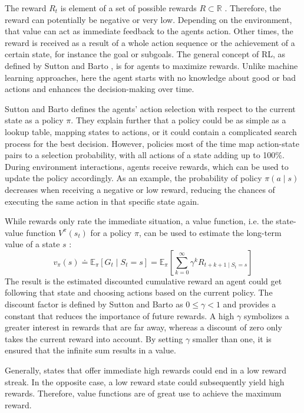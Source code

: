 The reward $R_t$ is element of a set of possible rewards $R \subset \mathbb{R}$ \cite{suba18}. Therefore, the reward can potentially be negative or very low. Depending on the environment, that value can act as immediate feedback to the agents action. Other times, the reward is received as a result of a whole action sequence or the achievement of a certain state, for instance the goal or subgoals. The general concept of RL, as defined by Sutton and Barto \cite{suba18}, is for agents to maximize rewards. Unlike machine learning approaches, here the agent starts with no knowledge about good or bad actions and enhances the decision-making over time.

Sutton and Barto defines the agents' action selection with respect to the current state as a policy $\pi$. They explain further that a policy could be as simple as a lookup table, mapping states to actions, or it could contain a complicated search process for the best decision. However, policies most of the time map action-state pairs to a selection probability, with all actions of a state adding up to 100\%.
During environment interactions, agents receive rewards, which can be used to update the policy accordingly. As an example, the probability of policy $\pi(a \mid s)$ decreases when receiving a negative or low reward, reducing the chances of executing the same action in that specific state again.

While rewards only rate the immediate situation, a value function, i.e. the state-value function $V^\pi(s_t)$ for a policy $\pi$, can be used to estimate the long-term value of a state $s$ \cite{suba18}:
\begin{equation}\label{eq:value_func}
    v_\pi(s) \doteq \mathbb{E}_\pi \left[ G_t \mid S_t = s \right] = \mathbb{E}_\pi \left[ \sum^{\infty}_{k=0} \gamma^k R_{t+k+1 \mid S_t = s}  \right]
\end{equation}
The result is the estimated discounted cumulative reward an agent could get following that state and choosing actions based on the current policy. The discount factor is defined by Sutton and Barto as $0 \le \gamma < 1$ and provides a constant that reduces the importance of future rewards. A high $\gamma$ symbolizes a greater interest in rewards that are far away, whereas a discount of zero only takes the current reward into account. By setting $\gamma$ smaller than one, it is ensured that the infinite sum results in a value.

Generally, states that offer immediate high rewards could end in a low reward streak. In the opposite case, a low reward state could subsequently yield high rewards. Therefore, value functions are of great use to achieve the maximum reward.

